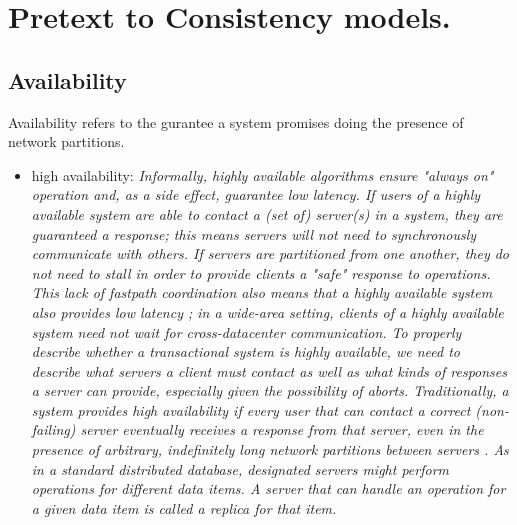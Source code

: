 \documentclass[a4paper,10pt,titlepage]{report}
\begin{document}
    \newpage


    \section{Pretext to Consistency models.}

    \subsection{Availability}

    Availability refers to the gurantee a system promises doing the presence of network partitions.\cite{HighlyAvailableTransactionsVirtuesandLimitations}

    \begin{itemize}
    \item high availability: 
    \textit{
    Informally, highly available algorithms ensure "always on" operation and, as a side effect, guarantee low latency. If users of a    highly available system are able to contact a (set of) server(s) in    a system, they are guaranteed a response; this means servers will    not need to synchronously communicate with others. If servers are    partitioned from one another, they do not need to stall in order to    provide clients a "safe" response to operations. This lack of fastpath coordination also means that a highly available system also    provides low latency ; in a wide-area setting, clients of a highly    available system need not wait for cross-datacenter communication. To properly describe whether a transactional system is highly    available, we need to describe what servers a client must contact    as well as what kinds of responses a server can provide, especially    given the possibility of aborts.    Traditionally, a system provides high availability if every user    that can contact a correct (non-failing) server eventually receives a    response from that server, even in the presence of arbitrary, indefinitely long network partitions between servers \cite{CAP}. As in a standard distributed database, designated servers might perform operations for different data items. A server that can handle an operation    for a given data item is called a replica for that item.}\cite{HighlyAvailableTransactionsVirtuesandLimitations}

\end{itemize}
\end{document}
